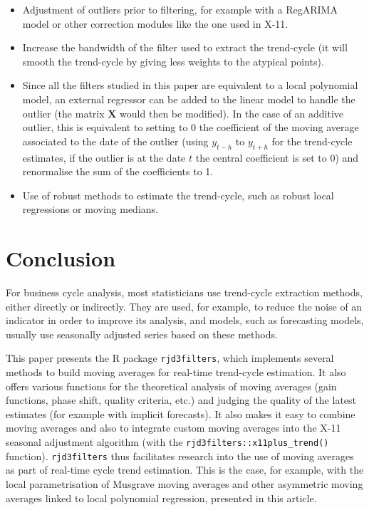 \documentclass[
]{article}
\newcommand\1{\mathds{1}}
\begin{document}
\begin{itemize}
\item
  Adjustment of outliers prior to filtering, for example with a RegARIMA
  model or other correction modules like the one used in X-11.
\item
  Increase the bandwidth of the filter used to extract the trend-cycle
  (it will smooth the trend-cycle by giving less weights to the atypical
  points).
\item
  Since all the filters studied in this paper are equivalent to a local
  polynomial model, an external regressor can be added to the linear
  model to handle the outlier (the matrix \(\boldsymbol X\) would then
  be modified). In the case of an additive outlier, this is equivalent
  to setting to 0 the coefficient of the moving average associated to
  the date of the outlier (using \(y_{t-h}\) to \(y_{t+h}\) for the
  trend-cycle estimates, if the outlier is at the date \(t\) the central
  coefficient is set to 0) and renormalise the sum of the coefficients
  to 1.
\item
  Use of robust methods to estimate the trend-cycle, such as robust
  local regressions or moving medians.
\end{itemize}

\section{Conclusion}\label{conclusion}

For business cycle analysis, most statisticians use trend-cycle
extraction methods, either directly or indirectly. They are used, for
example, to reduce the noise of an indicator in order to improve its
analysis, and models, such as forecasting models, usually use seasonally
adjusted series based on these methods.

This paper presents the R package \texttt{rjd3filters}, which implements
several methods to build moving averages for real-time trend-cycle
estimation. It also offers various functions for the theoretical
analysis of moving averages (gain functions, phase shift, quality
criteria, etc.) and judging the quality of the latest estimates (for
example with implicit forecasts). It also makes it easy to combine
moving averages and also to integrate custom moving averages into the
X-11 seasonal adjustment algorithm (with the
\texttt{rjd3filters::x11plus\_trend()} function). \texttt{rjd3filters}
thus facilitates research into the use of moving averages as part of
real-time cycle trend estimation. This is the case, for example, with
the local parametrisation of Musgrave moving averages and other
asymmetric moving averages linked to local polynomial regression,
presented in this article.
\end{document}
